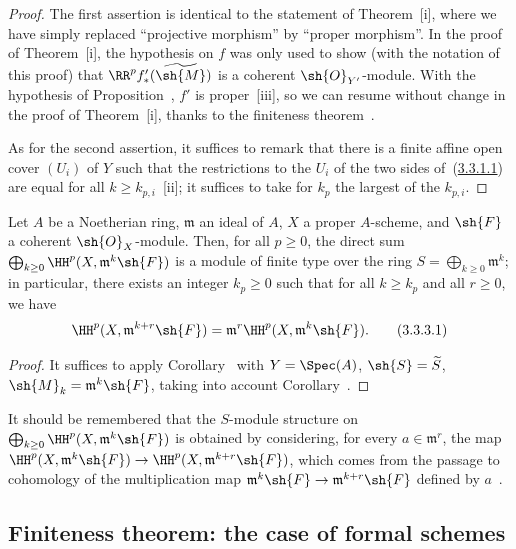 \begin{proof}
The first assertion is identical to the statement of Theorem~[i], where we have simply replaced ``projective morphism'' by ``proper morphism''.
In the proof of Theorem~[i], the hypothesis on $f$ was only used to show (with the notation of this proof) that $\RR^p f_*'(\widetilde{\sh{M}})$ is a coherent $\sh{O}_{Y'}$-module.
With the hypothesis of Proposition~, $f'$ is proper~[iii], so we can resume without change in the proof of Theorem~[i], thanks to the finiteness theorem~.

As for the second assertion, it suffices to remark that there is a finite affine open cover $(U_i)$ of $Y$ such that the restrictions to the $U_i$ of the two sides of~(\hyperref[III.3.3.1.1]{3.3.1.1}) are equal for all $k\geq k_{p,i}$~[ii]; it suffices to take for $k_p$ the largest of the $k_{p,i}$.
\end{proof}

\begin{corollary}[3.3.2]
\label{III.3.3.2}
Let $A$ be a Noetherian ring, $\mathfrak{m}$ an ideal of $A$, $X$ a proper $A$-scheme, and $\sh{F}$ a coherent $\sh{O}_X$-module.
Then, for all $p\geq 0$, the direct sum $\bigoplus_{k\geq 0}\HH^p(X,\mathfrak{m}^k\sh{F})$ is a module of finite type over the ring $S=\bigoplus_{k\geq 0}\mathfrak{m}^k$; in particular, there exists an integer $k_p\geq 0$ such that for all $k\geq k_p$ and all $r\geq 0$, we have
\[
\label{III.3.3.2.1}
  \HH^p(X,\mathfrak{m}^{k+r}\sh{F})=\mathfrak{m}^r\HH^p(X,\mathfrak{m}^k\sh{F}).
  \tag{3.3.3.1}
\]
\end{corollary}

\begin{proof}
It suffices to apply Corollary~ with $Y=\Spec(A)$, $\sh{S}=\widetilde{S}$, $\sh{M}_k=\mathfrak{m}^k\sh{F}$, taking into account Corollary~.
\end{proof}

It should be remembered that the $S$-module structure on $\bigoplus_{k\geq 0}\HH^p(X,\mathfrak{m}^k\sh{F})$ is obtained by considering, for every $a\in\mathfrak{m}^r$, the map $\HH^p(X,\mathfrak{m}^k\sh{F})\to\HH^p(X,\mathfrak{m}^{k+r}\sh{F})$, which comes from the passage to cohomology of the multiplication map $\mathfrak{m}^k\sh{F}\to\mathfrak{m}^{k+r}\sh{F}$ defined by $a$~.

\subsection{Finiteness theorem: the case of formal schemes}
\label{subsection:III.3.4}

